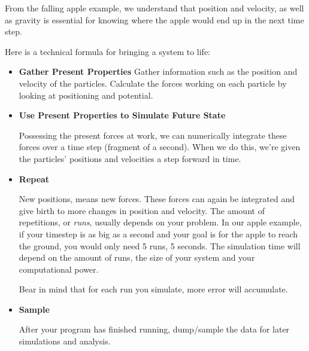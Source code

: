 \documentclass[10pt, a4paper]{report}
\begin{document}
From the falling apple example, we understand that position and velocity, as well as gravity is essential for knowing where 
the apple would end up in the next time step.

Here is a technical formula for bringing a system to life:
\begin{itemize}
 \item {\bf{Gather Present Properties}}
Gather information such as the position and velocity of the particles.
Calculate the forces working on each particle by looking at positioning and potential.
 \item {\bf{Use Present Properties to Simulate Future State}}
 
Possessing the present forces at work, we can numerically integrate these forces over a time step 
(fragment of a second).
When we do this, we're given the particles' positions and velocities a step forward in time.
 \item {\bf{Repeat}}

 New positions, means new forces. These forces can again be integrated and give birth to more changes in position and velocity.
 The amount of repetitions, or \emph{runs}, usually depends on your problem. In our apple example, if your timestep is as big as 
 a second and your goal is for the apple to reach the ground, you would only need 5 runs, 5 seconds.
 The simulation time will depend on the amount of runs, the size of your system and your computational power.
 
 Bear in mind that for each run you simulate, more error will accumulate.

\item {\bf{Sample}}

After your program has finished running, dump/sample the data for later simulations and analysis.
\end{itemize}
\end{document}
